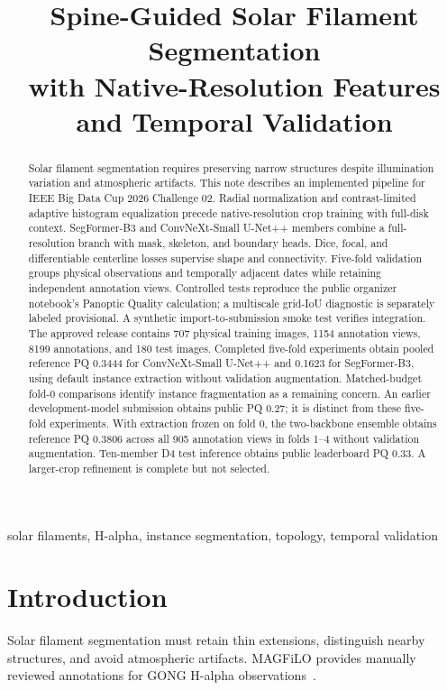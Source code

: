 \documentclass[conference]{IEEEtran}
\title{Spine-Guided Solar Filament Segmentation\\with Native-Resolution Features and Temporal Validation}
\author{\IEEEauthorblockN{Arjun Vijay Prakash}
\IEEEauthorblockA{Independent Researcher}}
\begin{document}
\maketitle
\begin{abstract}
Solar filament segmentation requires preserving narrow structures despite illumination variation and atmospheric artifacts. This note describes an implemented pipeline for IEEE Big Data Cup 2026 Challenge 02. Radial normalization and contrast-limited adaptive histogram equalization precede native-resolution crop training with full-disk context. SegFormer-B3 and ConvNeXt-Small U-Net++ members combine a full-resolution branch with mask, skeleton, and boundary heads. Dice, focal, and differentiable centerline losses supervise shape and connectivity. Five-fold validation groups physical observations and temporally adjacent dates while retaining independent annotation views. Controlled tests reproduce the public organizer notebook's Panoptic Quality calculation; a multiscale grid-IoU diagnostic is separately labeled provisional. A synthetic import-to-submission smoke test verifies integration. %
The approved release contains 707 physical training images, 1154 annotation views, 8199 annotations, and 180 test images. Completed five-fold experiments obtain pooled reference PQ 0.3444 for ConvNeXt-Small U-Net++ and 0.1623 for SegFormer-B3, using default instance extraction without validation augmentation. Matched-budget fold-0 comparisons identify instance fragmentation as a remaining concern. An earlier development-model submission obtains public PQ 0.27; it is distinct from these five-fold experiments. With extraction frozen on fold 0, the two-backbone ensemble obtains reference PQ 0.3806 across all 905 annotation views in folds 1--4 without validation augmentation. Ten-member D4 test inference obtains public leaderboard PQ 0.33. A larger-crop refinement is complete but not selected.
\end{abstract}
\begin{IEEEkeywords}
solar filaments, H-alpha, instance segmentation, topology, temporal validation
\end{IEEEkeywords}

\section{Introduction}
Solar filament segmentation must retain thin extensions, distinguish nearby structures, and avoid atmospheric artifacts. MAGFiLO provides manually reviewed annotations for GONG H-alpha observations~\cite{magfilo}.
\end{document}
